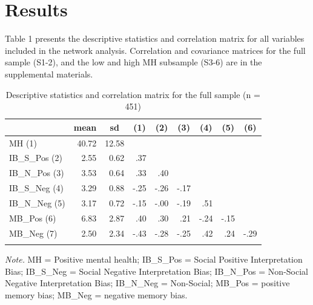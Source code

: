 \documentclass[man,floatsintext]{apa6}
\begin{document}
\hypertarget{results}{%
\section{Results}\label{results}}

Table 1 presents the descriptive statistics and correlation matrix for all variables included in the network analysis. Correlation and covariance matrices for the full sample (S1-2), and the low and high MH subsample (S3-6) are in the supplemental materials.

\begin{table}[tbp]
\begin{center}
\begin{threeparttable}
\caption{\label{tab:table1}Descriptive statistics and correlation matrix for the full sample (n = 451)}
\begin{tabular}{lrrrrrrrr}
\toprule
 & \multicolumn{1}{c}{mean} & \multicolumn{1}{c}{sd} & \multicolumn{1}{c}{(1)} & \multicolumn{1}{c}{(2)} & \multicolumn{1}{c}{(3)} & \multicolumn{1}{c}{(4)} & \multicolumn{1}{c}{(5)} & \multicolumn{1}{c}{(6)}\\
\midrule
MH (1) & 40.72 & 12.58 &  &  &  &  &  & \\
IB\_S\_Pos (2) & 2.55 & 0.62 & .37 &  &  &  &  & \\
IB\_N\_Pos (3) & 3.53 & 0.64 & .33 & .40 &  &  &  & \\
IB\_S\_Neg (4) & 3.29 & 0.88 & -.25 & -.26 & -.17 &  &  & \\
IB\_N\_Neg (5) & 3.17 & 0.72 & -.15 & -.00 & -.19 & .51 &  & \\
MB\_Pos (6) & 6.83 & 2.87 & .40 & .30 & .21 & -.24 & -.15 & \\
MB\_Neg (7) & 2.50 & 2.34 & -.43 & -.28 & -.25 & .42 & .24 & -.29\\
\bottomrule
\addlinespace
\end{tabular}
\begin{tablenotes}[para]
\normalsize{\textit{Note.} MH = Positive mental health; IB\_S\_Pos = Social Positive Interpretation Bias; IB\_S\_Neg = Social Negative Interpretation Bias; IB\_N\_Pos = Non-Social Negative Interpretation Bias; IB\_N\_Neg = Non-Social; MB\_Pos = positive memory bias; MB\_Neg = negative memory bias.}
\end{tablenotes}
\end{threeparttable}
\end{center}
\end{table}
\end{document}
